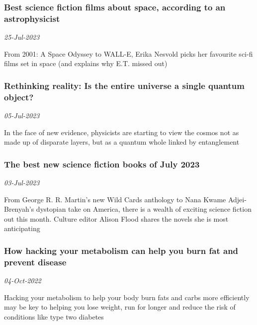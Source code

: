 \subsubsection{Best science fiction films about space, according to an astrophysicist \href{https://www.newscientist.com/article/2384184-best-science-fiction-films-about-space-according-to-an-astrophysicist/?utm_campaign=RSS%7CNSNS&utm_source=NSNS&utm_medium=RSS&utm_content=home}{}}
\textit{25-Jul-2023}

From 2001: A Space Odyssey to WALL-E, Erika Nesvold picks her favourite sci-fi films set in space (and explains why E.T. missed out)
\subsubsection{Rethinking reality: Is the entire universe a single quantum object? \href{https://www.newscientist.com/article/mg25834460-800-rethinking-reality-is-the-entire-universe-a-single-quantum-object/?utm_campaign=RSS%7CNSNS&utm_source=NSNS&utm_medium=RSS&utm_content=home}{\ding{225}}}
\textit{05-Jul-2023}

In the face of new evidence, physicists are starting to view the cosmos not as made up of disparate layers, but as a quantum whole linked by entanglement
\subsubsection{The best new science fiction books of July 2023 \href{https://www.newscientist.com/article/2380747-the-best-new-science-fiction-books-of-july-2023/?utm_campaign=RSS%7CNSNS&utm_source=NSNS&utm_medium=RSS&utm_content=home}{}}
\textit{03-Jul-2023}

From George R. R. Martin’s new Wild Cards anthology to Nana Kwame Adjei-Brenyah's dystopian take on America, there is a wealth of exciting science fiction out this month. Culture editor Alison Flood shares the novels she is most anticipating
\subsubsection{How hacking your metabolism can help you burn fat and prevent disease \href{https://www.newscientist.com/article/mg25634071-000-how-hacking-your-metabolism-can-help-you-burn-fat-and-prevent-disease/?utm_campaign=RSS%7CNSNS&utm_source=NSNS&utm_medium=RSS&utm_content=home}{\ding{225}}}
\textit{04-Oct-2022}

Hacking your metabolism to help your body burn fats and carbs more efficiently may be key to helping you lose weight, run for longer and reduce the risk of conditions like type two diabetes
